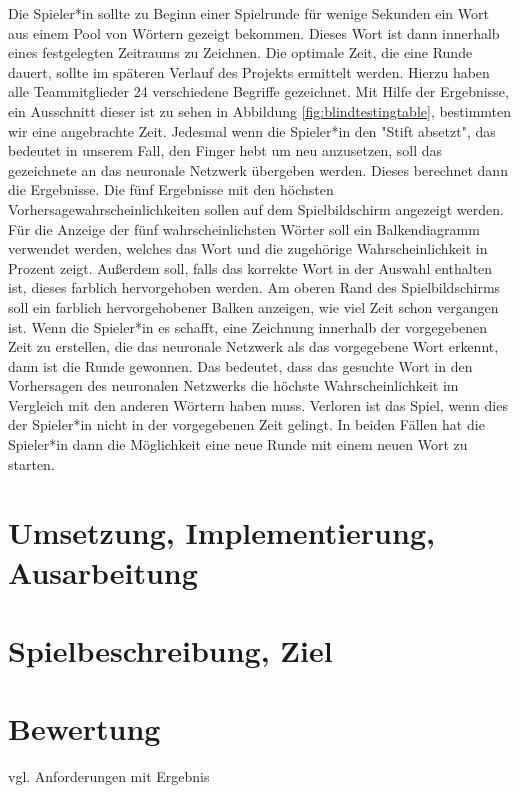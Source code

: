 \documentclass[11pt]{article}
\begin{document}
Die Spieler*in sollte zu Beginn einer Spielrunde für wenige Sekunden ein Wort aus einem Pool von Wörtern gezeigt bekommen. Dieses Wort ist dann innerhalb eines festgelegten Zeitraums zu Zeichnen. Die optimale Zeit, die eine Runde dauert, sollte im späteren Verlauf des Projekts ermittelt werden. Hierzu haben alle Teammitglieder 24 verschiedene Begriffe gezeichnet. Mit Hilfe der Ergebnisse, ein Ausschnitt dieser ist zu sehen in Abbildung \ref{fig:blindtestingtable}, bestimmten wir eine angebrachte Zeit.
Jedesmal wenn die Spieler*in den "Stift absetzt", das bedeutet in unserem Fall, den Finger hebt um neu anzusetzen, soll das gezeichnete an das neuronale Netzwerk übergeben werden. Dieses berechnet dann die Ergebnisse. Die fünf Ergebnisse mit den höchsten Vorhersagewahrscheinlichkeiten sollen auf dem Spielbildschirm angezeigt werden. Für die Anzeige der fünf wahrscheinlichsten Wörter soll ein Balkendiagramm verwendet werden, welches das Wort und die zugehörige Wahrscheinlichkeit in Prozent zeigt. Außerdem soll, falls das korrekte Wort in der Auswahl enthalten ist, dieses farblich hervorgehoben werden. Am oberen Rand des Spielbildschirms soll ein farblich hervorgehobener Balken anzeigen, wie viel Zeit schon vergangen ist.
Wenn die Spieler*in es schafft, eine Zeichnung innerhalb der vorgegebenen Zeit zu erstellen, die das neuronale Netzwerk als das vorgegebene Wort erkennt, dann ist die Runde gewonnen. Das bedeutet, dass das gesuchte Wort in den Vorhersagen des neuronalen Netzwerks die höchste Wahrscheinlichkeit im Vergleich mit den anderen Wörtern haben muss.
Verloren ist das Spiel, wenn dies der Spieler*in nicht in der vorgegebenen Zeit gelingt.
In beiden Fällen hat die Spieler*in dann die Möglichkeit eine neue Runde mit einem neuen Wort zu starten.
\section{Umsetzung, Implementierung, Ausarbeitung}
\section{Spielbeschreibung, Ziel}
\section{Bewertung}
vgl. Anforderungen mit Ergebnis

\pagebreak
\printbibliography
\end{document}
